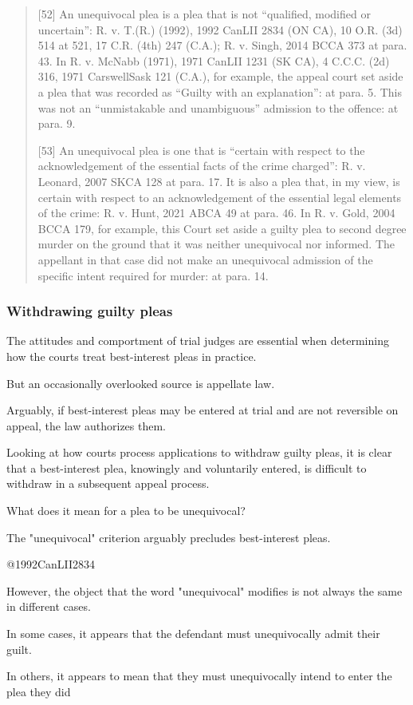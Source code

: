 \begin{quote}
    [52]      An unequivocal plea is a plea that is not “qualified, modified or uncertain”: R. v. T.(R.) (1992), 1992 CanLII 2834 (ON CA), 10 O.R. (3d) 514 at 521, 17 C.R. (4th) 247 (C.A.); R. v. Singh, 2014 BCCA 373 at para. 43. In R. v. McNabb (1971), 1971 CanLII 1231 (SK CA), 4 C.C.C. (2d) 316, 1971 CarswellSask 121 (C.A.), for example, the appeal court set aside a plea that was recorded as “Guilty with an explanation”: at para. 5. This was not an “unmistakable and unambiguous” admission to the offence: at para. 9.

    [53]      An unequivocal plea is one that is “certain with respect to the acknowledgement of the essential facts of the crime charged”: R. v. Leonard, 2007 SKCA 128 at para. 17. It is also a plea that, in my view, is certain with respect to an acknowledgement of the essential legal elements of the crime: R. v. Hunt, 2021 ABCA 49 at para. 46. In R. v. Gold, 2004 BCCA 179, for example, this Court set aside a guilty plea to second degree murder on the ground that it was neither unequivocal nor informed. The appellant in that case did not make an unequivocal admission of the specific intent required for murder: at para. 14.
\end{quote}

\subsubsection{Withdrawing guilty pleas} 

The attitudes and comportment of trial judges are essential when determining how the courts treat best-interest pleas in practice.

But an occasionally overlooked source is appellate law.

Arguably, if best-interest pleas may be entered at trial and are not reversible on appeal, the law authorizes them.

Looking at how courts process applications to withdraw guilty pleas, it is clear that a best-interest plea, knowingly and voluntarily entered, is difficult to withdraw in a subsequent appeal process.

What does it mean for a plea to be unequivocal?

The "unequivocal" criterion arguably precludes best-interest pleas.

@1992CanLII2834

However, the object that the word "unequivocal" modifies is not always the same in different cases.

In some cases, it appears that the defendant must unequivocally admit their guilt.

In others, it appears to mean that they must unequivocally intend to enter the plea they did

